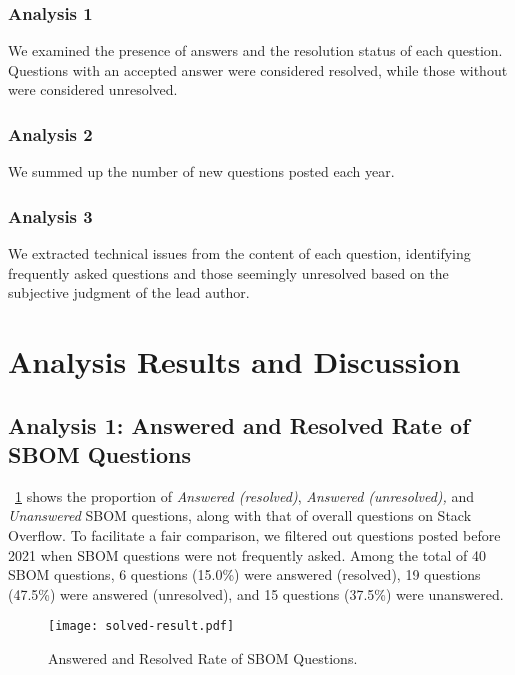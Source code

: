 \documentclass[conference]{IEEEtran}
\begin{document}
\subsubsection*{Analysis 1}
We examined the presence of answers and the resolution status of each question. Questions with an accepted answer were considered resolved, while those without were considered unresolved.

\subsubsection*{Analysis 2}
We summed up the number of new questions posted each year.

\subsubsection*{Analysis 3}
We extracted technical issues from the content of each question, identifying frequently asked questions and those seemingly unresolved based on the subjective judgment of the lead author.

\section{Analysis Results and Discussion}
\label{sec:result}

\subsection{Analysis 1: Answered and Resolved Rate of SBOM Questions}
\figurename~\ref{fig:q-resolved-result} shows the proportion of \emph{Answered (resolved)}, \emph{Answered (unresolved),} and \emph{Unanswered} SBOM questions, along with that of overall questions on Stack Overflow. To facilitate a fair comparison, we filtered out questions posted before 2021 when SBOM questions were not frequently asked. Among the total of 40 SBOM questions, 6 questions (15.0\%) were answered (resolved), 19 questions (47.5\%) were answered (unresolved), and 15 questions (37.5\%) were unanswered.

\begin{figure}[!t]
  \centering
  \texttt{[image: solved-result.pdf]}
  \caption{Answered and Resolved Rate of SBOM Questions.}
  \label{fig:q-resolved-result}
\end{figure}
\end{document}

